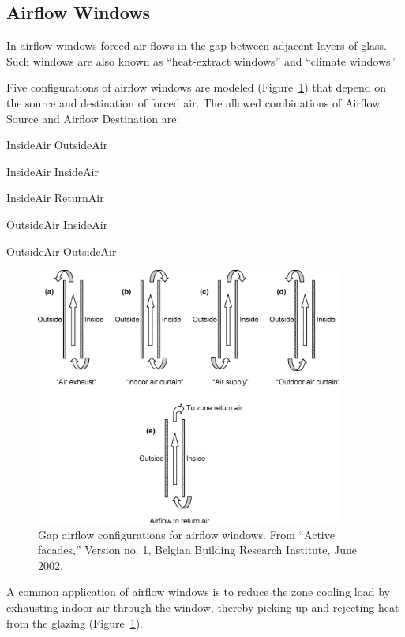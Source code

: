 \subsection{Airflow Windows}\label{airflow-windows}

In airflow windows forced air flows in the gap between adjacent layers of glass. Such windows are also known as ``heat-extract windows'' and ``climate windows.''

Five configurations of airflow windows are modeled (Figure~\ref{fig:gap-airflow-configurations-for-airflow}) that depend on the source and destination of forced air. The allowed combinations of Airflow Source and Airflow Destination are:

InsideAir \rightarrow OutsideAir

InsideAir \rightarrow InsideAir

InsideAir \rightarrow ReturnAir

OutsideAir \rightarrow InsideAir

OutsideAir \rightarrow OutsideAir

\begin{figure}[hbtp] %
\centering
\includegraphics[width=0.9\textwidth, height=0.9\textheight, keepaspectratio=true]{media/image1748.png}
\caption{Gap airflow configurations for airflow windows. From “Active facades,” Version no. 1, Belgian Building Research Institute, June 2002. \protect \label{fig:gap-airflow-configurations-for-airflow}}
\end{figure}

A common application of airflow windows is to reduce the zone cooling load by exhausting indoor air through the window, thereby picking up and rejecting heat from the glazing (Figure~\ref{fig:gap-airflow-configurations-for-airflow}).

